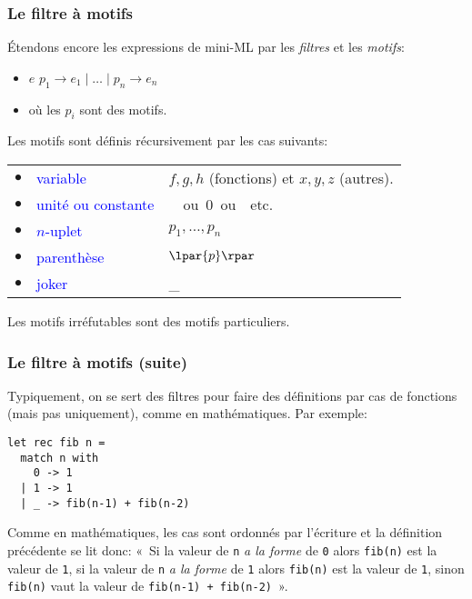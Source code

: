 
%
\begin{frame}
\frametitle{Le filtre à motifs}

Étendons encore les expressions de mini-ML par les \emph{filtres} et
les \emph{motifs}:
\begin{itemize}
 
  \item \Xmatch{} $e$ \Xwith{} $p_1 \rightarrow e_1 \mid \ldots \mid
    p_n \rightarrow e_n$
 
  \item où les $p_i$ sont des motifs.

\end{itemize}

\bigskip

Les motifs sont définis récursivement par les cas suivants:

\bigskip

\begin{tabular}{rll}
    $\bullet$
  & \textcolor{blue}{variable}
  & $f, g, h$ (fonctions) et $x, y, z$ (autres). \\
    $\bullet$
  & \textcolor{blue}{unité ou constante}
  & \unit \ ou \textsf{0} ou \Xtrue{} etc.\\
    $\bullet$
  & \textcolor{blue}{$n$-uplet}
  & $p_1, \ldots, p_n$\\
    $\bullet$
  & \textcolor{blue}{parenthèse}
  & $\lpar{p}\rpar$\\
    $\bullet$
  & \textcolor{blue}{joker}
  & {\Large \_}
\end{tabular}

\bigskip

\remarque \quad Les motifs irréfutables sont des motifs particuliers.

\end{frame}

%
\begin{frame}[containsverbatim]
\frametitle{Le filtre à motifs (suite)} 

Typiquement, on se sert des filtres pour faire des définitions par cas
de fonctions (mais pas uniquement), comme en mathématiques. Par exemple:
{\small
\begin{verbatim}
let rec fib n =
  match n with
    0 -> 1
  | 1 -> 1
  | _ -> fib(n-1) + fib(n-2)
\end{verbatim}
}Comme en mathématiques, les cas sont ordonnés par l'écriture et la
définition précédente se lit donc: «~Si la valeur de \texttt{n}
  \emph{a la forme} de \texttt{0} alors \texttt{fib(n)} est la valeur
  de \texttt{1}, si la valeur de \texttt{n} \emph{a la forme} de
  \texttt{1} alors \texttt{fib(n)} est la valeur de \texttt{1}, sinon
  \texttt{fib(n)} vaut la valeur de \texttt{fib(n-1) + fib(n-2)}~».

\end{frame}

